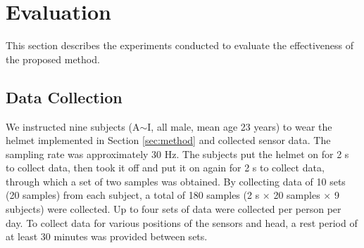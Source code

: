 \documentclass[sigchi,authordraft]{acmart}
\begin{document}



\section{Evaluation}
\label{sec:evaluation}
This section describes the experiments conducted to evaluate the effectiveness of the proposed method.



\subsection{Data Collection}
We instructed nine subjects (A$\sim$I, all male, mean age 23 years) to wear the helmet implemented in Section \ref{sec:method} and collected sensor data. The sampling rate was approximately 30 Hz. The subjects put the helmet on for 2 s to collect data, then took it off and put it on again for 2 s to collect data, through which a set of two samples was obtained. By collecting data of 10 sets (20 samples) from each subject, a total of 180 samples (2 s $\times$ 20 samples $\times$ 9 subjects) were collected. Up to four sets of data were collected per person per day. To collect data for various positions of the sensors and head, a rest period of at least 30 minutes was provided between sets.
\end{document}
